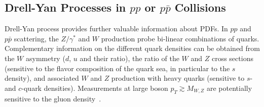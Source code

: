 %




\subsection{Drell-Yan Processes in $pp$ or $p\bar p$ Collisions}
\label{dysection}

Drell-Yan process
provides further valuable information about PDFs.
In $pp$ and $p\bar p$ scattering, the $Z/\gamma^*$ and $W$ production 
probe bi-linear combinations of quarks. 
Complementary information on the different quark densities
can be obtained from the $W$ asymmetry ($d$, $u$ and their ratio),
the ratio of the $W$ and $Z$ cross sections (sensitive to the flavor 
composition of the quark sea, in particular to the $s$ density), 
and associated $W$ and $Z$ production with
heavy quarks (sensitive to $s$- and $c$-quark densities).
 Measurements at large boson $p_T\gtrsim M_{W,Z}$ are potentially sensitive to the gluon density~\cite{Malik:2013kba}.
%

